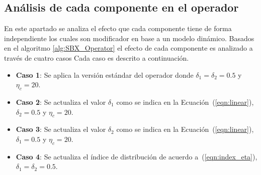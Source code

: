 \subsection{Análisis de cada componente en el operador \SBX{}}

En este apartado se analiza el efecto que cada componente tiene de forma independiente los cuales son modificador en base a un modelo dinámico.
%
%
Basados en el algoritmo \ref{alg:SBX_Operator} el efecto de cada componente es analizado a través de cuatro casos
%
Cada caso es descrito a continuación.

\begin{itemize}
\item \textbf{Caso 1}: Se aplica la versión estándar del operador \SBX{} donde $\delta_1 = \delta_2 = 0.5$ y $\eta_c = 20$.
\item \textbf{Caso 2}: Se actualiza el valor $\delta_1$ como se indica en la Ecuación~(\ref{eqn:linear}),  $\delta_2=0.5$ y $\eta_c = 20$.
\item \textbf{Caso 3}: Se actualiza el valor $\delta_2$ como se indica en la Ecuación~(\ref{eqn:linear}), $\delta_1=0.5$ y $\eta_c = 20$.
\item \textbf{Caso 4}: Se actualiza el índice de distribución de acuerdo a~(\ref{eqn:index_eta}), $\delta_1=\delta_2=0.5$.
\end{itemize}

